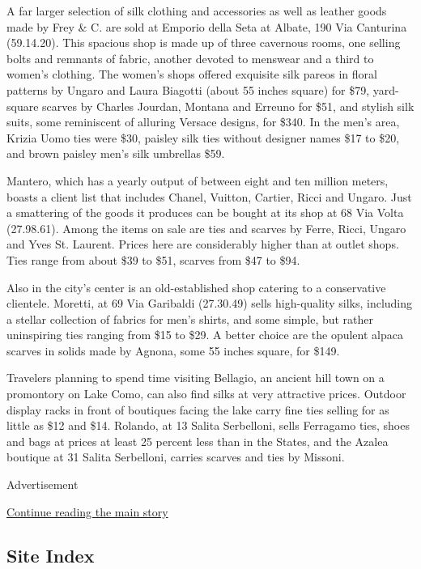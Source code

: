 A far larger selection of silk clothing and accessories as well as
leather goods made by Frey \& C. are sold at Emporio della Seta at
Albate, 190 Via Canturina (59.14.20). This spacious shop is made up of
three cavernous rooms, one selling bolts and remnants of fabric, another
devoted to menswear and a third to women's clothing. The women's shops
offered exquisite silk pareos in floral patterns by Ungaro and Laura
Biagotti (about 55 inches square) for \$79, yard-square scarves by
Charles Jourdan, Montana and Erreuno for \$51, and stylish silk suits,
some reminiscent of alluring Versace designs, for \$340. In the men's
area, Krizia Uomo ties were \$30, paisley silk ties without designer
names \$17 to \$20, and brown paisley men's silk umbrellas \$59.

Mantero, which has a yearly output of between eight and ten million
meters, boasts a client list that includes Chanel, Vuitton, Cartier,
Ricci and Ungaro. Just a smattering of the goods it produces can be
bought at its shop at 68 Via Volta (27.98.61). Among the items on sale
are ties and scarves by Ferre, Ricci, Ungaro and Yves St. Laurent.
Prices here are considerably higher than at outlet shops. Ties range
from about \$39 to \$51, scarves from \$47 to \$94.

Also in the city's center is an old-established shop catering to a
conservative clientele. Moretti, at 69 Via Garibaldi (27.30.49) sells
high-quality silks, including a stellar collection of fabrics for men's
shirts, and some simple, but rather uninspiring ties ranging from \$15
to \$29. A better choice are the opulent alpaca scarves in solids made
by Agnona, some 55 inches square, for \$149.

Travelers planning to spend time visiting Bellagio, an ancient hill town
on a promontory on Lake Como, can also find silks at very attractive
prices. Outdoor display racks in front of boutiques facing the lake
carry fine ties selling for as little as \$12 and \$14. Rolando, at 13
Salita Serbelloni, sells Ferragamo ties, shoes and bags at prices at
least 25 percent less than in the States, and the Azalea boutique at 31
Salita Serbelloni, carries scarves and ties by Missoni.

Advertisement

\protect\hyperlink{after-bottom}{Continue reading the main story}

\hypertarget{site-index}{%
\subsection{Site Index}\label{site-index}}

